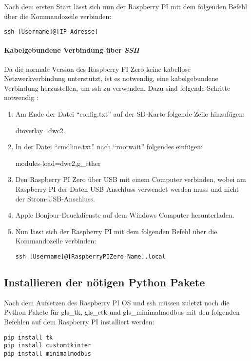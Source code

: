 Nach dem ersten Start lässt sich nun der Raspberry PI mit dem folgenden Befehl über die Kommandozeile verbinden:
\begin{verbatim}
ssh [Username]@[IP-Adresse]
\end{verbatim}

\paragraph{Kabelgebundene Verbindung über \textit{SSH}}
Da die normale Version des Raspberry PI Zero keine kabellose Netzwerkverbindung unterstützt, ist es notwendig, eine kabelgebundene Verbindung herzustellen, um \ac{ssh} zu verwenden. Dazu sind folgende Schritte notwendig \cite[vgl.][]{Piltch:2022}:

\begin{enumerate}
    \item Am Ende der Datei \enquote{config.txt} auf der SD-Karte folgende Zeile hinzufügen: \begin{textcode}
    dtoverlay=dwc2.
    \end{textcode}
    \item In der Datei \enquote{cmdline.txt} nach \enquote{rootwait} folgendes einfügen:
    \begin{textcode}
    modules-load=dwc2,g_ether
    \end{textcode}
    \item Den Raspberry PI Zero über USB mit einem Computer verbinden, wobei am Raspberry PI der Daten-USB-Anschluss verwendet werden muss und nicht der Strom-USB-Anschluss.
    \item Apple Bonjour-Druckdienste auf dem Windows Computer herunterladen.
    \item Nun lässt sich der Raspberry PI mit dem folgenden Befehl über die Kommandozeile verbinden:
    \begin{verbatim}
ssh [Username]@[RaspberryPIZero-Name].local
    \end{verbatim}
\end{enumerate}

\subsection{Installieren der nötigen Python Pakete}
Nach dem Aufsetzen des Raspberry PI OS und \ac{ssh} müssen zuletzt noch die Python Pakete für \gls{gls_tk}, \gls{gls_ctk} und \gls{gls_minimalmodbus} mit den folgenden Befehlen auf dem Raspberry PI installiert werden:

\begin{verbatim}
pip install tk
pip install customtkinter
pip install minimalmodbus
\end{verbatim}
